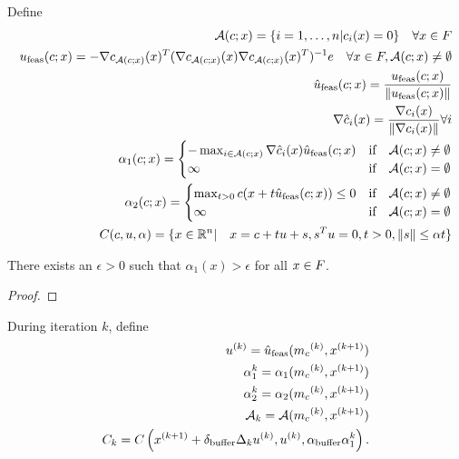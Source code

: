 Define
\begin{align*}
\mathcal A(c;x) = \{i =  1,\ldots, n| c_i(x) = 0\}  \quad \forall x \in {F} \\
{u_{\text{feas}}}(c;x) = -\nabla c_{\mathcal A(c;x)}(x)^T(\nabla c_{\mathcal A(c;x)}(x)\nabla c_{\mathcal A(c;x)}(x)^T)^{-1} e \quad \forall x \in {F},\mathcal A(c;x) \ne \emptyset \\
{\hat{u}_{\text{feas}}}(c;x) = \frac {{u_{\text{feas}}}(c;x)} {\| {u_{\text{feas}}} (c;x)\|}\\
\nabla \hat c_i(x) = \frac {\nabla c_i(x)}{\|\nabla c_i(x)\|} \forall i\\
\alpha_1(c;x) =
\begin{cases}
-\max_{i \in \mathcal A(c;x)} \nabla \hat c_i(x) {\hat{u}_{\text{feas}}}(c;x) & \text{if} \quad \mathcal A(c;x) \ne \emptyset \\
\infty & \text{if} \quad \mathcal A(c;x) = \emptyset
\end{cases} \\
\alpha_2(c;x) =
\begin{cases}
\max_{t > 0} c(x + t{\hat{u}_{\text{feas}}}(c;x)) \le 0 & \text{if} \quad \mathcal A(c;x) \ne \emptyset \\
\infty & \text{if} \quad \mathcal A(c;x) = \emptyset
\end{cases} \\
C(c, u, \alpha) = \{x \in \mathbb R^n | \quad x = c + t u + s, s^T u = 0, t > 0, \|s\| \le \alpha t\} \\
\end{align*}


\begin{theorem}
There exists an $\epsilon > 0$ such that $\alpha_1(x) > \epsilon$ for all $x \in {F}$.
\end{theorem}

\begin{proof}
\end{proof}


During iteration $k$, define
\begin{align*}
u^{(k)} = {\hat{u}_{\text{feas}}}({{m}_{c}}^{(k)}, {x}^{(k+1)}) \\
\alpha_1^k = \alpha_1({{m}_{c}}^{(k)}, {x}^{(k+1)}) \\
\alpha_2^k = \alpha_2({{m}_{c}}^{(k)}, {x}^{(k+1)}) \\
\mathcal A_k = \mathcal A({{m}_{c}}^{(k)}, {x}^{(k+1)}) \\
C_k = C\left({x}^{(k+1)} + {\delta_{\text{buffer}}}\Delta_k u^{(k)}, u^{(k)}, {\alpha_{\text{buffer}}}\alpha_1^k\right). \\
\end{align*}

